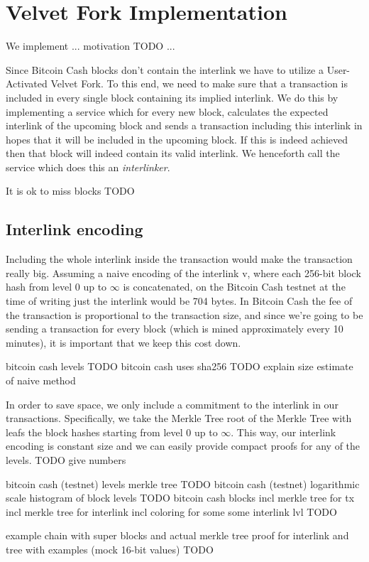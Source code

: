 \chapter{Velvet Fork Implementation}
We implement ... motivation TODO ...

Since Bitcoin Cash blocks don't contain the interlink we have to utilize a User-Activated Velvet Fork. To this end, we need to make sure that a transaction is included in every single block containing its implied interlink. We do this by implementing a service which for every new block, calculates the expected interlink of the upcoming block and sends a transaction including this interlink in hopes that it will be included in the upcoming block. If this is indeed achieved then that block will indeed contain its valid interlink. We henceforth call the service which does this an \emph{interlinker}.

It is ok to miss blocks TODO

\section{Interlink encoding}
Including the whole interlink inside the transaction would make the transaction really big. Assuming a naive encoding of the interlink v, where each 256-bit block hash from level $0$ up to $\infty$ is concatenated, on the Bitcoin Cash testnet at the time of writing just the interlink would be 704 bytes. In Bitcoin Cash the fee of the transaction is proportional to the transaction size, and since we're going to be sending a transaction for every block (which is mined approximately every 10 minutes), it is important that we keep this cost down. 

bitcoin cash levels TODO
bitcoin cash uses sha256 TODO explain size estimate of naive method

In order to save space, we only include a commitment to the interlink in our transactions. Specifically, we take the Merkle Tree root of the Merkle Tree with leafs the block hashes starting from level $0$ up to $\infty$. This way, our interlink encoding is constant size and we can easily provide compact proofs for any of the levels. TODO give numbers

bitcoin cash (testnet) levels merkle tree TODO
bitcoin cash (testnet) logarithmic scale histogram of block levels TODO
bitcoin cash blocks incl merkle tree for tx incl merkle tree for interlink incl coloring for some some interlink lvl TODO

example chain with super blocks and actual merkle tree proof for interlink and tree with examples (mock 16-bit values) TODO

